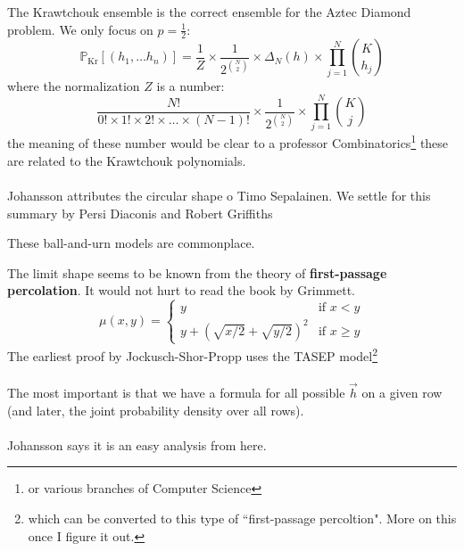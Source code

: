 \documentclass[12pt]{article}
\begin{document}
\newpage

\noindent The Krawtchouk ensemble is the correct ensemble for the Aztec Diamond problem.  We only focus on $p = \frac{1}{2}$:
$$ \mathbb{P}_{\text{Kr}}[(h_1, \dots h_n)]= \frac{1}{Z} \times \frac{1}{2^{\binom{N}{2}}} \times \Delta_N(h) \times  \prod_{j=1}^N \binom{K}{h_j} $$ 
where the normalization $Z$ is a number:
$$ \frac{N!}{0!\times 1!\times 2!\times \dots \times (N-1)!} \times \frac{1}{2^{\binom{N}{2}}} \times \prod_{j=1}^N \binom{K}{j} $$
the meaning of these number would be clear to a professor Combinatorics\footnote{or various branches of Computer Science} these are related to the Krawtchouk polynomials.  \\ \\
Johansson attributes the circular shape o Timo Sepalainen.  We settle for this summary by Persi Diaconis and Robert Griffiths
\begin{quotation}
\color{black!60!white}{Orthogonal polynomials for the multinomial distribution of N balls dropped into d boxes  are called multivariate Krawtchouk polynomials.}
\end{quotation}
These ball-and-urn models are commonplace.

\newpage

\noindent The limit shape seems to be known from the theory of \textbf{first-passage percolation}.  It would not hurt to read the book by Grimmett.
$$ 
\mu(x,y) = 
\left\{ 
\begin{array}{ll} 
y & \text{if }x < y \\
y + (\sqrt{x/2} + \sqrt{y/2})^2 & \text{if }x \geq y
\end{array}
 \right.
$$
The earliest proof by Jockusch-Shor-Propp uses the TASEP model\footnote{which can be converted to this type of ``first-passage percoltion".  More on this once I figure it out.} \\ \\ 
The most important is that we have a formula for all possible $\vec{h}$ on a given row (and later, the joint probability density over all rows). \\ \\ Johansson says it is an easy analysis from here.

\newpage
\end{document}
